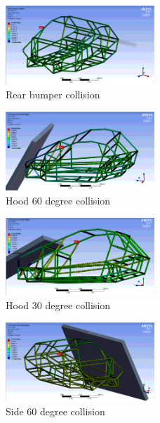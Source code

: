 \documentclass[10pt]{article}
\begin{document}
\begin{figure}[H]
\centering
\includegraphics[width=0.5\textwidth]{figures/fea/chassis/chassis-collision-bumper-rear}
\caption{Rear bumper collision}
\label{sec:chassis-collision-bumper-rear}
\end{figure}

\begin{figure}[H]
\centering
\includegraphics[width=0.5\textwidth]{figures/fea/chassis/chassis-collision-hood-60deg}
\caption{Hood 60 degree collision}
\label{sec:chassis-collision-hood-60deg}
\end{figure}

\begin{figure}[H]
\centering
\includegraphics[width=0.5\textwidth]{figures/fea/chassis/chassis-collision-hood-30deg}
\caption{Hood 30 degree collision}
\label{sec:chassis-collision-hood-30deg}
\end{figure}

\begin{figure}[H]
\centering
\includegraphics[width=0.5\textwidth]{figures/fea/chassis/chassis-collision-side-60deg}
\caption{Side 60 degree collision}
\label{sec:chassis-collision-side-60deg}
\end{figure}
\end{document}
